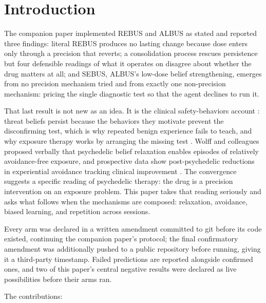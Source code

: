 \documentclass[11pt]{article}
\begin{document}
\section{Introduction}

The companion paper \cite{rogers2026} implemented REBUS \cite{carhart2019} and
ALBUS \cite{safron2025} as stated and reported three findings: literal REBUS
produces no lasting change because dose enters only through a precision that
reverts; a consolidation process rescues persistence but four defensible readings
of what it operates on disagree about whether the drug matters at all; and SEBUS,
ALBUS's low-dose belief strengthening, emerges from no precision mechanism tried
and from exactly one non-precision mechanism: pricing the single diagnostic test
so that the agent declines to run it.

That last result is not new as an idea. It is the clinical safety-behaviors
account \cite{salkovskis1991}: threat beliefs persist because the behaviors they
motivate prevent the disconfirming test, which is why repeated benign experience
fails to teach, and why exposure therapy works by arranging the missing test
\cite{foakozak1986,craske2014}. Wolff and colleagues \cite{wolff2020} proposed
verbally that psychedelic belief relaxation enables episodes of relatively
avoidance-free exposure, and prospective data show post-psychedelic reductions in
experiential avoidance tracking clinical improvement \cite{zeifman2020avoid}. The
convergence suggests a specific reading of psychedelic therapy: the drug is a
precision intervention on an exposure problem. This paper takes that reading
seriously and asks what follows when the mechanisms are composed: relaxation,
avoidance, biased learning, and repetition across sessions.

Every arm was declared in a written amendment committed to git before its code
existed, continuing the companion paper's protocol; the final confirmatory
amendment was additionally pushed to a public repository before running, giving
it a third-party timestamp. Failed predictions are reported alongside confirmed
ones, and two of this paper's central negative results were declared as live
possibilities before their arms ran.

The contributions:
\end{document}
